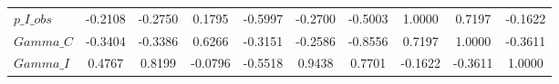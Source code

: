 \begin{center}
\begin{longtable}{lccccccccc}
$p\_I\_obs      $	 & 	          -0.2108	 & 	          -0.2750	 & 	           0.1795	 & 	          -0.5997	 & 	          -0.2700	 & 	          -0.5003	 & 	           1.0000	 & 	           0.7197	 & 	          -0.1622 \\ 
$Gamma\_C       $	 & 	          -0.3404	 & 	          -0.3386	 & 	           0.6266	 & 	          -0.3151	 & 	          -0.2586	 & 	          -0.8556	 & 	           0.7197	 & 	           1.0000	 & 	          -0.3611 \\ 
$Gamma\_I       $	 & 	           0.4767	 & 	           0.8199	 & 	          -0.0796	 & 	          -0.5518	 & 	           0.9438	 & 	           0.7701	 & 	          -0.1622	 & 	          -0.3611	 & 	           1.0000 \\ 
\end{longtable}
 \end{center}
